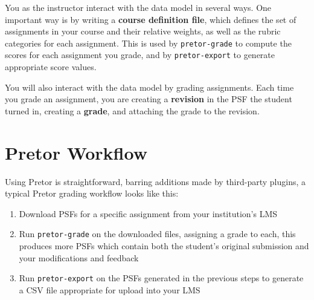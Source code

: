 \documentclass{book}
\begin{document}

You as the instructor interact with the data model in several ways. One
important way is by writing a \textbf{course definition file}, which defines
the set of assignments in your course and their relative weights, as well as
the rubric categories for each assignment. This is used by
\texttt{pretor-grade} to compute the scores for each assignment you grade, and
by \texttt{pretor-export} to generate appropriate score values.

You will also interact with the data model by grading assignments. Each time
you grade an assignment, you are creating a \textbf{revision} in the PSF the
student turned in, creating a \textbf{grade}, and attaching the grade to the
revision.


\section{Pretor Workflow}

Using Pretor is straightforward, barring additions made by third-party plugins,
a typical Pretor grading workflow looks like this:

\begin{enumerate}

	\item Download PSFs for a specific assignment from your institution's
		LMS

	\item Run \texttt{pretor-grade} on the downloaded files, assigning a
		grade to each, this produces more PSFs which contain both the
		student's original submission and your modifications and
		feedback

	\item Run \texttt{pretor-export} on the PSFs generated in the previous
		steps to generate a CSV file appropriate for upload into your
		LMS

\end{enumerate}
\end{document}
